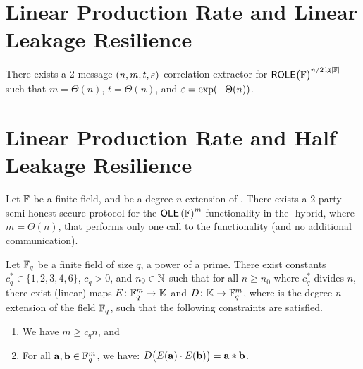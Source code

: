 \documentclass{llncs}
\begin{document}
\section{Linear Production Rate and Linear Leakage Resilience}
	\begin{theorem}
		\label{thm:main} 
		There exists a 2-message $(n,m,t,\varepsilon)$-correlation extractor for $\ROLE[\bbF]^{n/2\lg\abs\bbF}$  such that $m=\Theta(n)$, $t=\Theta(n)$, and $\varepsilon=\exp(-\Theta(n))$. %
	\end{theorem}

\section{Linear Production Rate and Half Leakage Resilience}

	\begin{theorem}
		\label{thm:embed-low}
		Let ${\mathbb F}$ be a finite field, and \bbK be a degree-$n$ extension of \bbF. 
		There exists a 2-party semi-honest secure protocol for the $\OLE[\bbF]^m$ functionality in the \OLE[\bbK]-hybrid, where $m=\Theta(n)$, that performs only one call to the \OLE[\bbK] functionality (and no additional communication). 
	\end{theorem}

	\begin{theorem}
		\label{thm:embed}
		Let ${\mathbb F}_q$ be a finite field of size $q$, a power of a prime. 
		There exist constants $c_q^* \in \{1,2,3,4,6\}$, $c_q > 0$, and $n_0 \in {\mathbb N}$ such that for all $n \geq n_0$ where $c_q^*$ divides $n$, there exist (linear) maps $E \colon {\mathbb F}^m_{q} \rightarrow {\mathbb K}$ and $D\colon {\mathbb K} \rightarrow {\mathbb F}^m_{q}$, where \bbK is the degree-$n$ extension of the field ${\mathbb F}_q$, such that the following constraints are satisfied.
		\begin{enumerate}
			\item We have $m \geq c_qn$, and
			\item For all ${\mathbf a}, {\mathbf b} \in {\mathbb F}_{q}^m$, we have: 
			$D\big( E({\mathbf a})\cdot E({\mathbf b}) \big) = {\mathbf a}*{\mathbf b}$. 
		\end{enumerate}
	\end{theorem}


\end{document}
